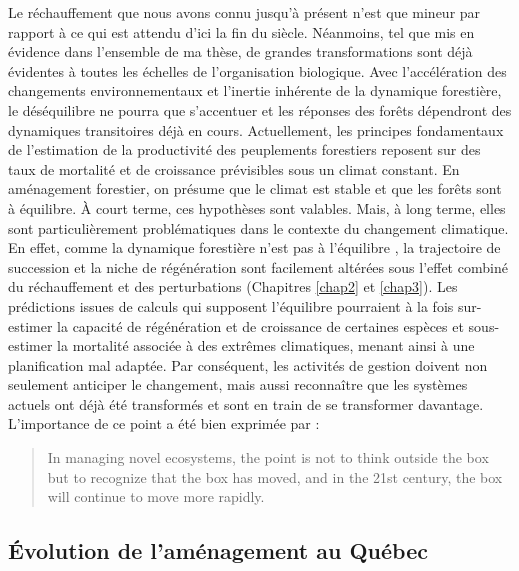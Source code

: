 Le réchauffement que nous avons connu jusqu'à présent n'est que mineur
par rapport à ce qui est attendu d'ici la fin du siècle. Néanmoins, tel
que mis en évidence dans l'ensemble de ma thèse, de grandes
transformations sont déjà évidentes à toutes les échelles de
l'organisation biologique. Avec l'accélération des changements
environnementaux et l'inertie inhérente de la dynamique forestière, le
déséquilibre ne pourra que s'accentuer et les réponses des forêts
dépendront des dynamiques transitoires déjà en cours. Actuellement, les
principes fondamentaux de l'estimation de la productivité des
peuplements forestiers reposent sur des taux de mortalité et de
croissance prévisibles sous un climat constant. En aménagement
forestier, on présume que le climat est stable et que les forêts sont à
équilibre. À court terme, ces hypothèses sont valables. Mais, à long
terme, elles sont particulièrement problématiques dans le contexte du
changement climatique. En effet, comme la dynamique forestière n'est pas
à l'équilibre \citep{talluto_extinction_2017}, la trajectoire de
succession et la niche de régénération sont facilement altérées sous
l'effet combiné du réchauffement et des perturbations (Chapitres
\ref{chap2} et \ref{chap3}). Les prédictions issues de calculs qui
supposent l'équilibre pourraient à la fois sur-estimer la capacité de
régénération et de croissance de certaines espèces et sous-estimer la
mortalité associée à des extrêmes climatiques, menant ainsi à une
planification mal adaptée. Par conséquent, les activités de gestion
doivent non seulement anticiper le changement, mais aussi reconnaître
que les systèmes actuels ont déjà été transformés et sont en train de se
transformer davantage. L'importance de ce point a été bien exprimée par
\citet{seastedt_management_2008} :

\begin{quote}
In managing novel ecosystems, the point is not to think outside the box
but to recognize that the box has moved, and in the 21st century, the
box will continue to move more rapidly.
\end{quote}

\hypertarget{uxe9volution-de-lamuxe9nagement-au-quuxe9bec}{%
\subsection{Évolution de l'aménagement au
Québec}\label{uxe9volution-de-lamuxe9nagement-au-quuxe9bec}}

